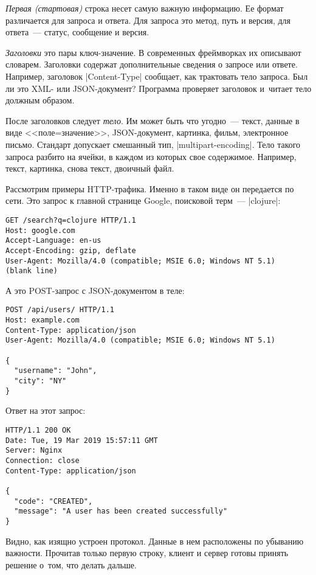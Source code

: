 \emph{Первая (стартовая)} строка несет самую важную информацию. Ее формат
различается для запроса и ответа. Для запроса это метод, путь и версия, для
ответа~--- статус, сообщение и версия.

\emph{Заголовки} это пары ключ-значение. В современных фреймворках их
описывают словарем. Заголовки содержат дополнительные сведения о запросе или
ответе. Например, заголовок \spverb|Content-Type| сообщает, как трактовать тело
запроса. Был ли это XML- или JSON-документ? Программа проверяет заголовок
и~читает тело должным образом.

После заголовков следует \emph{тело}. Им может быть что угодно~--- текст, данные
в виде <<поле=значение>>, JSON-документ, картинка, фильм, электронное
письмо. Стандарт допускает смешанный тип, \spverb|multipart-encoding|. Тело
такого запроса разбито на ячейки, в каждом из которых свое содержимое. Например,
текст, картинка, снова текст, двоичный файл.

Рассмотрим примеры HTTP-трафика. Именно в таком виде он передается
по сети. Это запрос к главной странице Google, поисковой терм~--- \spverb|clojure|:

\begin{verbatim}
GET /search?q=clojure HTTP/1.1
Host: google.com
Accept-Language: en-us
Accept-Encoding: gzip, deflate
User-Agent: Mozilla/4.0 (compatible; MSIE 6.0; Windows NT 5.1)
(blank line)
\end{verbatim}

\noindent
А это POST-запрос с JSON-документом в теле:

\begin{verbatim}
POST /api/users/ HTTP/1.1
Host: example.com
Content-Type: application/json
User-Agent: Mozilla/4.0 (compatible; MSIE 6.0; Windows NT 5.1)

{
  "username": "John",
  "city": "NY"
}
\end{verbatim}

\noindent
Ответ на этот запрос:

\begin{verbatim}
HTTP/1.1 200 OK
Date: Tue, 19 Mar 2019 15:57:11 GMT
Server: Nginx
Connection: close
Content-Type: application/json

{
  "code": "CREATED",
  "message": "A user has been created successfully"
}
\end{verbatim}

Видно, как изящно устроен протокол. Данные в нем расположены по убыванию важности.
Прочитав только первую строку, клиент и сервер готовы принять решение о~том,
что делать дальше.

